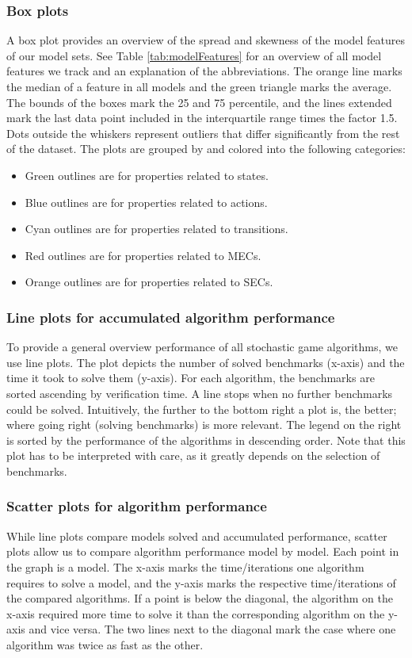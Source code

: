 \subsubsection*{Box plots} \label{plot:boxplot}
A box plot provides an overview of the spread and skewness of the model features of our model sets.
See Table \ref{tab:modelFeatures} for an overview of all model features we track and an explanation of the abbreviations.
The orange line marks the median of a feature in all models and the green triangle marks the
average. The bounds of the boxes mark the 25 and 75 percentile, and the lines extended
mark the last data point included in the interquartile range times the factor 1.5. Dots outside the whiskers represent
outliers that differ significantly from the rest of the dataset.
The plots are grouped by and colored into the following categories:
\begin{itemize}
    \item Green outlines are for properties related to states. 
    \item Blue outlines are for properties related to actions. 
    \item Cyan outlines are for properties related to transitions.
    \item Red outlines are for properties related to MECs.
    \item Orange outlines are for properties related to SECs. 
\end{itemize}

\subsubsection*{Line plots for accumulated algorithm performance} \label{plot:starplot}
To provide a general overview performance of all stochastic game algorithms, we use line plots.
The plot depicts the number of solved benchmarks (x-axis) and the time it took to solve them (y-axis). 
For each algorithm, the benchmarks are sorted ascending by verification time. A line stops when no further benchmarks could be solved.
Intuitively, the further to the bottom right a plot is, the better; where going right (solving benchmarks) is more relevant.
The legend on the right is sorted by the performance of the algorithms in descending order.
Note that this plot has to be interpreted with care, as it greatly depends on the selection of benchmarks.

\subsubsection*{Scatter plots for algorithm performance} \label{plot:performanceScatter}
While line plots compare models solved and accumulated performance, scatter plots allow us to compare algorithm performance model by model.
Each point in the graph is a model. The x-axis marks the time/iterations one algorithm requires to solve a model, and the y-axis marks the respective time/iterations of the compared algorithms.
If a point is below the diagonal, the algorithm on the x-axis required more time to solve it than the corresponding algorithm on the y-axis and vice versa.
The two lines next to the diagonal mark the case where one algorithm was twice as fast as the other.

